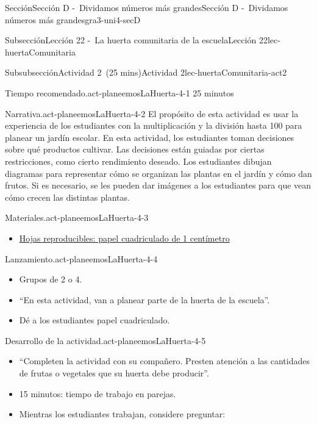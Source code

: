 \documentclass[oneside,10pt,]{article}
\begin{document}
\begin{sectionptx}{Sección}{Sección D -~Dividamos números más grandes}{}{Sección D -~Dividamos números más grandes}{}{}{gra3-uni4-secD}
\begin{subsectionptx}{Subsección}{Lección 22 -~La huerta comunitaria de la escuela}{}{Lección 22}{}{}{lec-huertaComunitaria}
%
\begin{subsubsectionptx}{Subsubsección}{Actividad 2~(25 mins)}{}{Actividad 2}{}{}{lec-huertaComunitaria-act2}
\par
\begin{paragraphs}{Tiempo recomendado.}{act-planeemosLaHuerta-4-1}%
25 minutos%
\end{paragraphs}%
\begin{paragraphs}{Narrativa.}{act-planeemosLaHuerta-4-2}%
El propósito de esta actividad es usar la experiencia de los estudiantes con la multiplicación y la división hasta 100 para planear un jardín escolar. En esta actividad, los estudiantes toman decisiones sobre qué productos cultivar. Las decisiones están guiadas por ciertas restricciones, como cierto rendimiento deseado. Los estudiantes dibujan diagramas para representar cómo se organizan las plantas en el jardín y cómo dan frutos. Si es necesario, se les pueden dar imágenes a los estudiantes para que vean cómo crecen las distintas plantas.%
\end{paragraphs}%
\begin{paragraphs}{Materiales.}{act-planeemosLaHuerta-4-3}%
%
\begin{itemize}[label=\textbullet]
\item{}\hyperref[blm-papelCuadriculadoCentimetro]{Hojas reproducibles: papel cuadriculado de 1 centímetro}%
\end{itemize}
\end{paragraphs}%
\begin{paragraphs}{Lanzamiento.}{act-planeemosLaHuerta-4-4}%
%
\begin{itemize}[label=\textbullet]
\item{}Grupos de 2 o 4.%
\item{}``En esta actividad, van a planear parte de la huerta de la escuela''.%
\item{}Dé a los estudiantes papel cuadriculado.%
\end{itemize}
\end{paragraphs}%
\begin{paragraphs}{Desarrollo de la actividad.}{act-planeemosLaHuerta-4-5}%
%
\begin{itemize}[label=\textbullet]
\item{}``Completen la actividad con su compañero. Presten atención a las cantidades de frutas o vegetales que su huerta debe producir''.%
\item{}15 minutos: tiempo de trabajo en parejas.%
\item{}Mientras los estudiantes trabajan, considere preguntar:%

\end{itemize}
\end{paragraphs}
\end{subsubsectionptx}
\end{subsectionptx}
\end{sectionptx}
\end{document}

